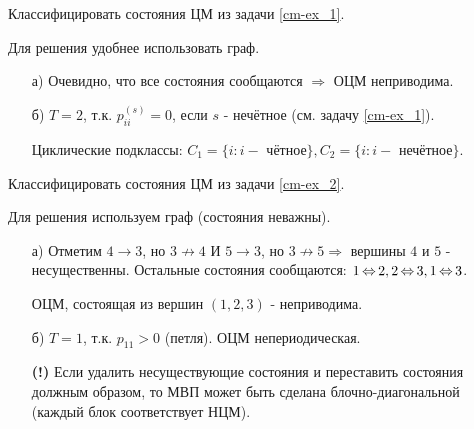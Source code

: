 \begin{exmp}
	Классифицировать состояния ЦМ из задачи \ref{cm-ex_1}.
	
	Для решения удобнее использовать граф.
	\begin{enumerate}
		\item[а)] Очевидно, что все состояния сообщаются $\Rightarrow$ ОЦМ неприводима.
		\item[б)] $T=2$, т.к. $p_{ii}^{(s)} = 0$, если $s$ - нечётное (см. задачу \ref{cm-ex_1}).
		
		Циклические подклассы: $C_1 = \{ i: i - \text{ чётное} \}, C_2 = \{ i: i - \text{ нечётное} \}$.
	\end{enumerate}
\end{exmp}
\begin{exmp}
	Классифицировать состояния ЦМ из задачи \ref{cm-ex_2}.
	
	Для решения используем граф (состояния неважны).
	\begin{enumerate}
		\item[а)] Отметим $4 \to 3$, но $3 \not\to 4$ И $5 \to 3$, но $3 \not\to 5 \Rightarrow$ вершины $4$ и $5$ - несущественны. Остальные состояния сообщаются: $1 \operatorname{\Leftrightarrow} 2, 2 \operatorname{\Leftrightarrow} 3, 1 \operatorname{\Leftrightarrow} 3$.
		
		ОЦМ, состоящая из вершин $(1, 2, 3)$ - неприводима.
		\item[б)] $T=1$, т.к. $p_{11} > 0$ (петля). ОЦМ непериодическая.
		
		\textbf{(!)} Если удалить несуществующие состояния и переставить состояния должным образом, то МВП может быть сделана блочно-диагональной (каждый блок соответствует НЦМ).
	\end{enumerate}
	\begin{figure}[h]
	\end{figure}
\end{exmp}

